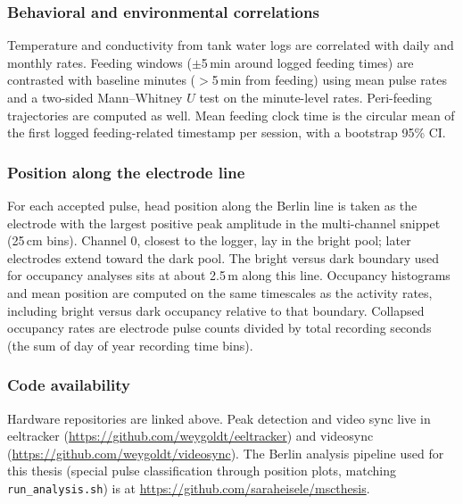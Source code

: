 \subsubsection{Behavioral and environmental correlations}

Temperature and conductivity from tank water logs are correlated with daily and monthly rates.
Feeding windows ($\pm$5\,min around logged feeding times) are contrasted with baseline minutes ($>$5\,min from feeding) using mean pulse rates and a two-sided Mann--Whitney $U$ test on the minute-level rates.
Peri-feeding trajectories are computed as well.
Mean feeding clock time is the circular mean of the first logged feeding-related timestamp per session, with a bootstrap 95\% CI.

\subsubsection{Position along the electrode line}

For each accepted pulse, head position along the Berlin line is taken as the electrode with the largest positive peak amplitude in the multi-channel snippet (25\,cm bins).
Channel 0, closest to the logger, lay in the bright pool; later electrodes extend toward the dark pool.
The bright versus dark boundary used for occupancy analyses sits at about 2.5\,m along this line.
Occupancy histograms and mean position are computed on the same timescales as the activity rates, including bright versus dark occupancy relative to that boundary.
Collapsed occupancy rates are electrode pulse counts divided by total recording seconds (the sum of day of year recording time bins).

\subsubsection{Code availability}

Hardware repositories are linked above. 
Peak detection and video sync live in eeltracker (\url{https://github.com/weygoldt/eeltracker}) and videosync (\url{https://github.com/weygoldt/videosync}). 
The Berlin analysis pipeline used for this thesis (special pulse classification through position plots, matching \texttt{run\_analysis.sh}) is at \url{https://github.com/saraheisele/mscthesis}.
